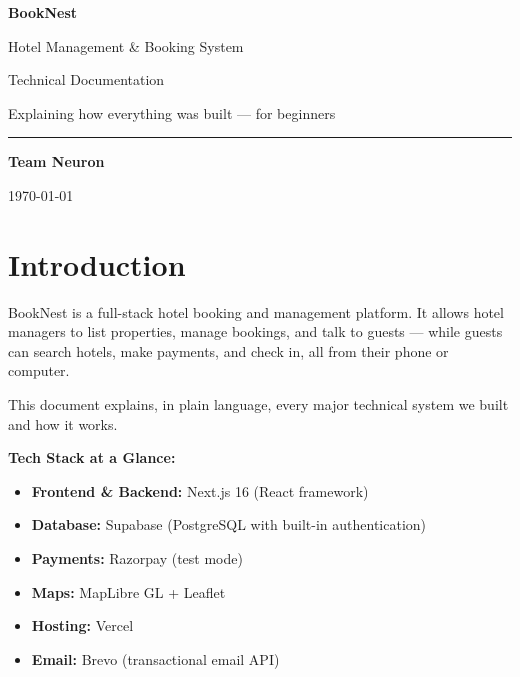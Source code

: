\documentclass[12pt,a4paper]{article}
\begin{document}
\begin{titlepage}
    \centering
    \vspace*{3cm}
    {\Huge\bfseries\color{primary} BookNest\par}
    \vspace{0.5cm}
    {\Large Hotel Management \& Booking System\par}
    \vspace{1cm}
    {\large Technical Documentation\par}
    \vspace{0.5cm}
    {\normalsize Explaining how everything was built --- for beginners\par}
    \vspace{2cm}
    \hrule
    \vspace{0.5cm}
    {\large \textbf{Team Neuron}\par}
    \vspace{3cm}
    {\small \today\par}
\end{titlepage}

\tableofcontents
\newpage

\section{Introduction}

BookNest is a full-stack hotel booking and management platform. It allows hotel managers to list properties, manage bookings, and talk to guests --- while guests can search hotels, make payments, and check in, all from their phone or computer.

This document explains, in plain language, every major technical system we built and how it works.

\begin{notebox}
\textbf{Tech Stack at a Glance:}
\begin{itemize}[noitemsep]
  \item \textbf{Frontend \& Backend:} Next.js 16 (React framework)
  \item \textbf{Database:} Supabase (PostgreSQL with built-in authentication)
  \item \textbf{Payments:} Razorpay (test mode)
  \item \textbf{Maps:} MapLibre GL + Leaflet
  \item \textbf{Hosting:} Vercel
  \item \textbf{Email:} Brevo (transactional email API)
\end{itemize}
\end{notebox}
\end{document}
